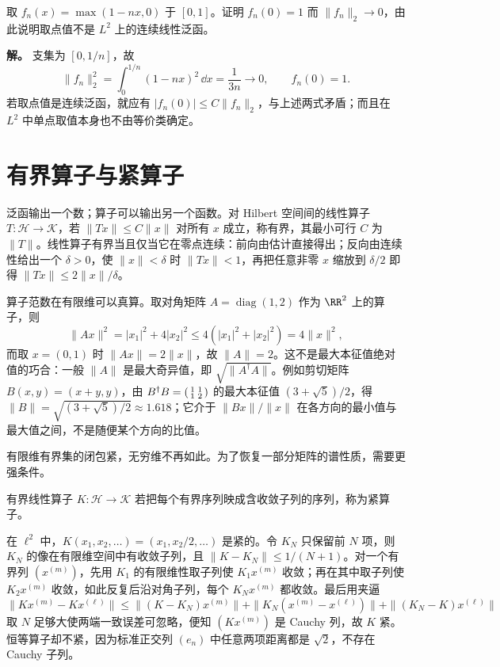 \par
\begin{workedexample}
取 \(f_n(x)=\max(1-nx,0)\) 于 \([0,1]\)。证明 \(f_n(0)=1\) 而 \(\|f_n\|_2\to0\)，由此说明取点值不是 \(L^2\) 上的连续线性泛函。


\textbf{解。} 支集为 \([0,1/n]\)，故
\[
\|f_n\|_2^2=\int_0^{1/n}(1-nx)^2\,\dd x=\frac1{3n}\longrightarrow0,
\qquad f_n(0)=1.
\]
若取点值是连续泛函，就应有 \(|f_n(0)|\le C\|f_n\|_2\)，与上述两式矛盾；而且在 \(L^2\) 中单点取值本身也不由等价类确定。
\end{workedexample}
\par
\section{有界算子与紧算子}

泛函输出一个数；算子可以输出另一个函数。对 Hilbert 空间间的线性算子 \(T:\mathcal H\to\mathcal K\)，若 \(\|Tx\|\le C\|x\|\) 对所有 \(x\) 成立，称有界，其最小可行 \(C\) 为 \(\|T\|\)。线性算子有界当且仅当它在零点连续：前向由估计直接得出；反向由连续性给出一个 \(\delta>0\)，使 \(\|x\|<\delta\) 时 \(\|Tx\|<1\)，再把任意非零 \(x\) 缩放到 \(\delta/2\) 即得 \(\|Tx\|\le2\|x\|/\delta\)。

算子范数在有限维可以真算。取对角矩阵 \(A=\operatorname{diag}(1,2)\) 作为 \(\RR^2\) 上的算子，则
\[
\|Ax\|^2=|x_1|^2+4|x_2|^2\le4(|x_1|^2+|x_2|^2)=4\|x\|^2,
\]
而取 \(x=(0,1)\) 时 \(\|Ax\|=2\|x\|\)，故 \(\|A\|=2\)。这不是最大本征值绝对值的巧合：一般 \(\|A\|\) 是最大奇异值，即 \(\sqrt{\|A^\dagger A\|}\)。例如剪切矩阵 \(B(x,y)=(x+y,y)\)，由
\(B^\dagger B=\begin{psmallmatrix}1&1\\1&2\end{psmallmatrix}\) 的最大本征值
\((3+\sqrt5)/2\)，得 \(\|B\|=\sqrt{(3+\sqrt5)/2}\approx1.618\)；它介于 \(\|Bx\|/\|x\|\) 在各方向的最小值与最大值之间，不是随便某个方向的比值。

有限维有界集的闭包紧，无穷维不再如此。为了恢复一部分矩阵的谱性质，需要更强条件。

\begin{definition}[紧算子]
有界线性算子 \(K:\mathcal H\to\mathcal K\) 若把每个有界序列映成含收敛子列的序列，称为紧算子。
\end{definition}

在 \(\ell^2\) 中，\(K(x_1,x_2,\ldots)=(x_1,x_2/2,\ldots)\) 是紧的。令 \(K_N\) 只保留前 \(N\) 项，则 \(K_N\) 的像在有限维空间中有收敛子列，且 \(\|K-K_N\|\le1/(N+1)\)。对一个有界列 \((x^{(m)})\)，先用 \(K_1\) 的有限维性取子列使 \(K_1x^{(m)}\) 收敛；再在其中取子列使 \(K_2x^{(m)}\) 收敛，如此反复后沿对角子列，每个 \(K_Nx^{(m)}\) 都收敛。最后用夹逼
\[
\|Kx^{(m)}-Kx^{(\ell)}\|
\le\|(K-K_N)x^{(m)}\|+\|K_N(x^{(m)}-x^{(\ell)})\|+\|(K_N-K)x^{(\ell)}\|
\]
取 \(N\) 足够大使两端一致误差可忽略，便知 \((Kx^{(m)})\) 是 Cauchy 列，故 \(K\) 紧。恒等算子却不紧，因为标准正交列 \((e_n)\) 中任意两项距离都是 \(\sqrt2\)，不存在 Cauchy 子列。

